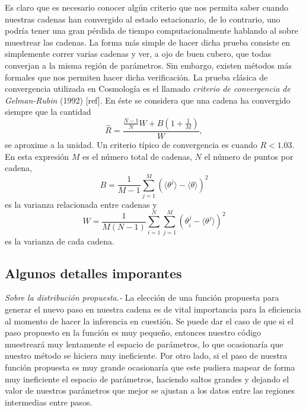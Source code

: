 \documentclass[onecolumn,           %
               showpacs,            %
               preprintnumbers,     %
               aps,                 %
               prl,          	    %
               letterpaper,             %
               superscriptaddress,      %
               nofootinbib,         %
               tightenlines,        %
               floats,floatfix      %
               ,usenatbib,
               ]{revtex4-1}
\begin{document}
Es claro que es necesario conocer alg\'un criterio que nos permita saber cuando nuestras cadenas han convergido al estado estacionario, de lo contrario, uno podr\'ia tener una gran p\'erdida de tiempo computacionalmente hablando al sobre muestrear las cadenas. La forma m\'as simple de hacer dicha prueba consiste en simplemente correr varias cadenas y ver, a ojo de buen cubero, que todas converjan a la misma regi\'on de par\'ametros. Sin embargo, existen m\'etodos m\'as formales que nos permiten hacer dicha verificaci\'on. La prueba cl\'asica de convergencia utilizada en Cosmolog\'ia es el llamado \textit{criterio de convergencia de Gelman-Rubin}  (1992) [ref]. En \'este se considera que una cadena ha convergido siempre que la cantidad 
\begin{equation}
\hat R=\frac{\frac{N-1}{N}W+B(1+\frac{1}{M})}{W},
\end{equation}
se aproxime a la unidad. Un criterio t\'ipico de convergencia es cuando $R<1.03$. En esta expresi\'on $M$ es el n\'umero total de cadenas, $N$ el n\'umero de puntos por cadena,
\begin{equation}
B=\frac{1}{M-1}\sum_{j=1}^M(\langle\theta^j\rangle-\langle\theta\rangle)^2
\end{equation}
es la varianza relacionada entre cadenas y 
\begin{equation}
W=\frac{1}{M(N-1)}\sum_{i=1}^N\sum_{j=1}^M(\theta_i^j-\langle\theta^j\rangle)^2
\end{equation}
es la varianza de cada cadena. 

\subsection{Algunos detalles imporantes}

\textit{Sobre la distribuci\'on propuesta.-} La elecci\'on de una funci\'on propuesta para generar el nuevo paso en nuestra cadena es de vital importancia para la eficiencia al momento de hacer la inferencia en cuesti\'on. Se puede dar el caso de que si el paso propuesto en la funci\'on es muy peque\~no, entonces nuestro c\'odigo muestrear\'a muy lentamente el espacio de par\'ametros, lo que ocasionar\'ia que nuestro m\'etodo se hiciera muy ineficiente. Por otro lado, si el paso de nuestra funci\'on propuesta es muy grande ocasionar\'ia que este pudiera mapear de forma muy ineficiente el espacio de par\'ametros, haciendo saltos grandes y dejando el valor de nuestros par\'ametros que mejor se ajustan a los datos entre las regiones intermedias entre pasos.
\\ $ $ 
\end{document}
